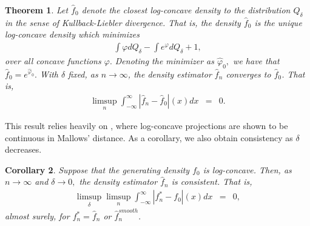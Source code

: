 \documentclass[12pt]{article} %
\newtheorem{theorem}{Theorem}
\newtheorem{corollary}[theorem]{Corollary}
\begin{document}
  










\begin{theorem}\label{thm:projection}
Let $\widehat f_0$ denote the closest log-concave density to the distribution $Q_\delta$ in the sense of Kullback-Liebler divergence.   That is, the density $\widehat f_0$ is the unique log-concave density which minimizes 
\begin{eqnarray*}
\int \varphi dQ_\delta - \int  e^\varphi dQ_\delta +1,
\end{eqnarray*}
over all concave functions $\varphi.$   Denoting the minimizer as $\widehat \varphi_0,$ we have that $\widehat f_0 = e^{\widehat \varphi_0}.$
With $\delta$ fixed, as $n\rightarrow \infty$, the density estimator $\widehat f_n$ converges to $\widehat f_0$.   That is, 
\begin{eqnarray*}
\limsup_{n} \int_{-\infty}^{\infty} |\widehat f_n-\widehat f_0|(x)dx  &= & 0.
\end{eqnarray*}
\end{theorem}
This result relies heavily on \citet[Theorem 2.15]{DSS2011}, where log-concave projections are shown to be continuous in Mallows' distance.  As a corollary, we also obtain consistency as $\delta$ decreases.

\begin{corollary}\label{cor:cons}
Suppose that the generating density $f_0$ is log-concave.  Then, as $n\rightarrow \infty$ and $\delta\rightarrow 0,$ the density estimator $\widehat f_n$ is consistent.   That is, 
\begin{eqnarray*}
\limsup_{\delta} \limsup_n \int_{-\infty}^{\infty} |f^*_n-f_0|(x)dx  &= & 0,
\end{eqnarray*}
almost surely, for $f^*_n=\widehat f_n$ or $\widehat f_n^{smooth}.$
\end{corollary}
\end{document}
